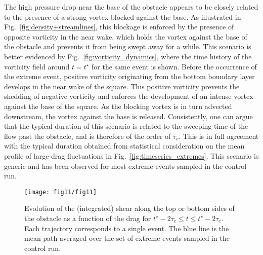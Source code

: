 The high pressure drop near the base of the obstacle appears to be closely related to the presence of a strong vortex blocked against the base. 
As illustrated in Fig.~\ref{fig:density+streamlines}, this blockage is enforced by the presence of opposite vorticity in the near wake, which holds the vortex against the base of the obstacle and prevents it from being swept away for a while.
% 
This scenario is better evidenced by Fig.~\ref{fig:vorticity_dynamics}, where the time history of the vorticity field around $t=t^\star$ for the same event is shown. 
%
Before the occurrence of the extreme event, positive vorticity originating from the bottom boundary layer develops in the near wake of the square. This positive vorticity  prevents the shedding of negative vorticity and enforces the development of an intense vortex against the base of the square. 
As the blocking vortex is in turn advected downstream, the vortex against the base is released.
%
Consistently, one can argue that the typical duration of this scenario is related to the sweeping time of the flow past the obstacle, and is therefore of the order of $\tau_c$.
This is in full agreement with the typical duration obtained from statistical consideration on the mean profile of large-drag fluctuations in Fig.~\ref{fig:timeseries_extremes}.
This scenario is generic and has been observed for most extreme events sampled in the control run.

\begin{figure}
	\centering
	\texttt{[image: fig11/fig11]}
	\caption{\label{fig:shear_asof_drag} Evolution of the (integrated) shear along the top or bottom sides of the obstacle as a function of the drag for $t^{\star}-2\tau_c \leq t \leq t^{\star}-2\tau_c$. Each trajectory corresponds to a single event. The blue line is the mean path averaged over the set of extreme events sampled in the control run.}
\end{figure}

